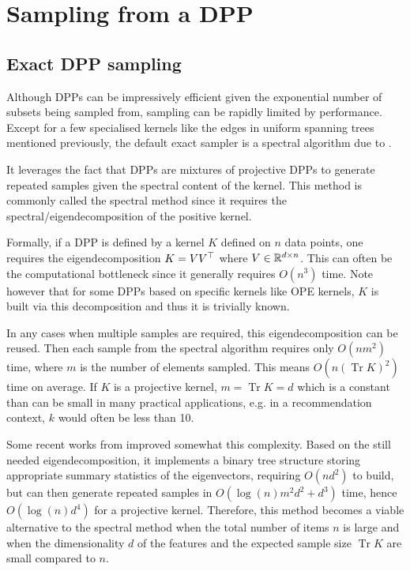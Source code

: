 \section{Sampling from a DPP}
\label{sec__sampling_DPP}
\subsection{Exact DPP sampling}


Although DPPs can be impressively efficient given the exponential number of subsets being sampled from, sampling can be rapidly limited by performance. 
Except for a few specialised kernels like the edges in uniform spanning trees mentioned previously, the default exact sampler is a spectral algorithm due to \cite{hough2006_hkpv}.

It leverages the fact that DPPs are mixtures of projective DPPs to generate repeated samples given the spectral content of the kernel. This method is commonly called the spectral method since it requires the spectral/eigendecomposition of the positive kernel. 

Formally, if a DPP is defined by a kernel $K$ defined on $n$ data points, one requires the eigendecomposition $K= V V^\top$  where $V \in \mathbb{R}^{d \times n}$. 
This can often be the computational bottleneck since it generally requires $O(n^3)$ time. Note however that for some DPPs based on specific kernels like OPE kernels, $K$ is built via this decomposition and thus it is trivially known.

In any cases when multiple samples are required, this eigendecomposition can be reused. Then each sample from the spectral algorithm requires only $O(n m^2)$ time, where $m$ is the number of elements sampled. This means $O(n (\operatorname{Tr} K)^2)$ time on average. If $K$ is a projective kernel, $m = \operatorname{Tr} K = d$ which is a constant than can be small in many practical applications, e.g. in a recommendation context, $k$ would often be less than 10.

Some recent works from \cite{gillenwater2019_treebased_fast_dpp_sampling} improved somewhat this complexity. Based on the still needed eigendecomposition, it implements a binary tree structure storing appropriate summary statistics of the eigenvectors, requiring $O(n d^2)$ to build, but can then generate repeated
samples in $O(\log(n)m^2d^2 + d^3)$ time, hence $O(\log(n)d^4)$ for a projective kernel. Therefore, this method becomes a viable alternative to the spectral method when the total
number of items $n$ is large and when the dimensionality $d$ of the
features and the expected sample size $\operatorname{Tr} K$ are small compared to $n$.





